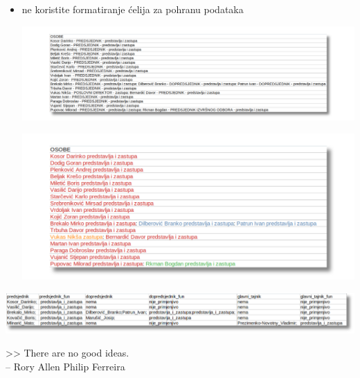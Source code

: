 \documentclass[handout,aspectratio=169]{beamer}
\begin{document}
\begin{frame}
    \begin{itemize}
        \vspace*{1em}

        \item ne koristite formatiranje ćelija za pohranu podataka

        \pause

        \vspace{1em}

        \hspace{-.8em}%
        \includegraphics[scale=.30]{images/colorless-sadness.png}

        \pause
        
        \includegraphics[scale=.30]{images/colorful-sadness.png}

    \end{itemize}
\end{frame}

\begin{frame}
    \begin{center}
        \includegraphics[scale=.45]{images/nicer-party-yes.png}
    \end{center}

    \pause

    \vspace*{3em}

    \hspace*{10em}>> There are no good ideas.\\
    \hspace{13em}-- Rory Allen Philip Ferreira
\end{frame}
\end{document}
